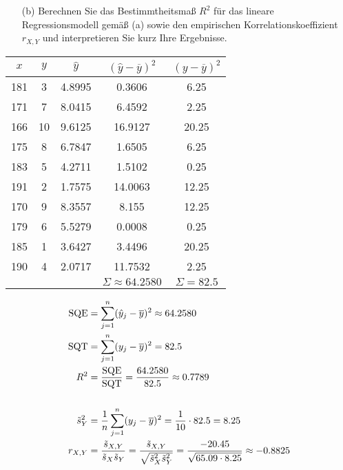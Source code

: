 \begin{task}
    \begin{enumerate}
        \item[(b)] Berechnen Sie das Bestimmtheitsmaß $R^2$ für das lineare Regressionsmodell gemäß (a) sowie den empirischen Korrelationskoeffizient $r_{X,Y}$ und interpretieren Sie kurz Ihre Ergebnisse.
    \end{enumerate}
\end{task}

\begin{table}[H]
\centering
\begin{tabular}{c|cc|cc}
    $x$ & $y$ & $\hat{y}$ & $(\hat{y} - \overline{y})^2$ & $(y-\overline{y})^2$ \\\hline
    181 &  3  & 4.8995    & 0.3606                       & 6.25                 \\
    171 &  7  & 8.0415    & 6.4592                       & 2.25                 \\
    166 & 10  & 9.6125    & 16.9127                      & 20.25                \\
    175 &  8  & 6.7847    & 1.6505                       & 6.25                 \\
    183 &  5  & 4.2711    & 1.5102                       & 0.25                 \\
    191 &  2  & 1.7575    & 14.0063                      & 12.25                \\
    170 &  9  & 8.3557    & 8.155                        & 12.25                \\
    179 &  6  & 5.5279    & 0.0008                       & 0.25                 \\
    185 &  1  & 3.6427    & 3.4496                       & 20.25                \\
    190 &  4  & 2.0717    & 11.7532                      & 2.25                 \\\hline
        &     &           & $\Sigma\approx64.2580$       & $\Sigma=82.5 $
\end{tabular}
\end{table}

{\allowdisplaybreaks
    \begin{align*}
        \operatorname{SQE} &= \sum_{j=1}^{n} (\hat{y}_j - \overline{y})^2 \approx 64.2580 \\*
        \operatorname{SQT} &= \sum_{j=1}^{n} (y_j - \overline{y})^2 = 82.5 \\*
        R^2 &= \frac{\operatorname{SQE}}{\operatorname{SQT}} = \frac{64.2580}{82.5} \approx 0.7789 \\*
        \nonumber \\
        \tilde{s}_Y^2 &= \frac1n \sum_{j=1}^{n} (y_j - \overline{y})^2 = \frac{1}{10}\cdot82.5 = 8.25 \\*
        r_{X,Y} &= \frac{\tilde{s}_{X,Y}}{\tilde{s}_X \tilde{s}_Y} = \frac{\tilde{s}_{X,Y}}{\sqrt{\tilde{s}_X^2 \tilde{s}_Y^2}}
            = \frac{-20.45}{\sqrt{65.09\cdot8.25}} \approx -0.8825
    \end{align*}
}

